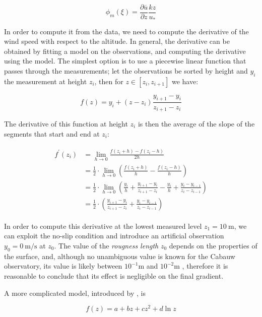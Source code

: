 \documentclass[a4paper,11pt]{kth-mag}
\begin{document}
$$
\phi_m(\xi)=\frac{\partial\overline{u}}{\partial z}\frac{kz}{u_*}
$$

In order to compute it from the data, we need to compute the derivative of the wind speed with respect to the altitude. In general, the derivative can be obtained by fitting a model on the observations, and computing the derivative using the model. The simplest option is to use a piecewise linear function that passes through the measurements; let the observations be sorted by height and $y_i$ the measurement at height $z_i$, then for $z\in[z_i,z_{i+1}]$ we have:

\begin{equation}
f(z)=y_i+(z-z_i)\frac{y_{i+1}-y_i}{z_{i+1}-z_i}
\end{equation}

The derivative of this function at height $z_i$ is then the average of the slope of the segments that start and end at $z_i$:

\begin{align}
\label{eq:fd_gradient}
\begin{split}
f^\prime(z_i)&=\lim_{h\rightarrow 0}\frac{f(z_i+h)-f(z_i-h)}{2h} \\
&=\frac{1}{2}\cdot\lim_{h\rightarrow 0}\left(\frac{f(z_i+h)}{h}-\frac{f(z_i-h)}{h}\right) \\
&=\frac{1}{2}\cdot\lim_{h\rightarrow 0}\left(
\frac{y_i}{h}+\frac{y_{i+1}-y_i}{z_{i+1}-z_i}-\frac{y_i}{h}+\frac{y_i-y_{i-1}}{z_i-z_{i-1}}
\right)\\
&=\frac{1}{2}\cdot\left(
\frac{y_{i+1}-y_i}{z_{i+1}-z_i}+\frac{y_i-y_{i-1}}{z_i-z_{i-1}}
\right)
\end{split}
\end{align}

In order to compute this derivative at the lowest measured level $z_1=\SI{10}{\meter}$, we can exploit the no-slip condition and introduce an artificial observation $y_0=\SI{0}{\meter\per\second}$ at $z_0$. The value of the \emph{rougness length} $z_0$ depends on the properties of the surface, and, although no unambiguous value is known for the Cabauw observatory, its value is likely between $10^{-1}$m and $10^{-2}$m \citep{cabauw_z0, cabauw_night}, therefore it is reasonable to conclude that its effect is negligible on the final gradient.

A more complicated model, introduced by \cite{windlogprofile}, is

\begin{equation}
\label{eq:logmodel}
f(z)=a+bz+cz^2+d\ln z
\end{equation}
\end{document}
